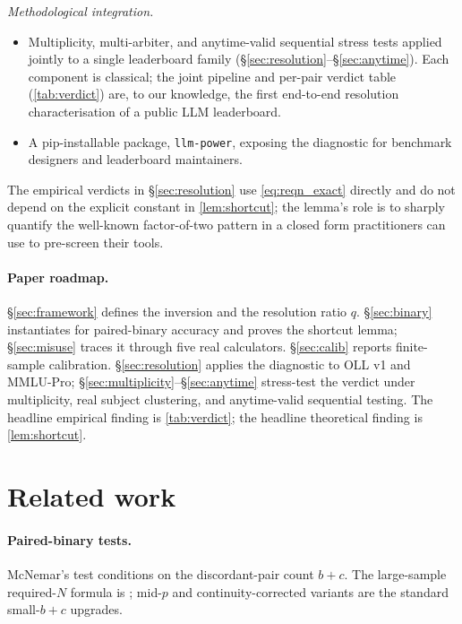 \documentclass{article}
\theoremstyle{plain}
\theoremstyle{definition}
\begin{document}
\noindent\emph{Methodological integration.}
\begin{itemize}[leftmargin=*, itemsep=0pt, topsep=2pt]
\item Multiplicity, multi-arbiter, and anytime-valid sequential stress tests applied jointly to a single leaderboard family (\S\ref{sec:resolution}--\S\ref{sec:anytime}). Each component is classical; the joint pipeline and per-pair verdict table (\cref{tab:verdict}) are, to our knowledge, the first end-to-end resolution characterisation of a public LLM leaderboard.
\item A pip-installable package, \texttt{llm-power}, exposing the diagnostic for benchmark designers and leaderboard maintainers.
\end{itemize}

\noindent The empirical verdicts in \S\ref{sec:resolution} use \cref{eq:reqn_exact} directly and do not depend on the explicit constant in \cref{lem:shortcut}; the lemma's role is to sharply quantify the well-known factor-of-two pattern in a closed form practitioners can use to pre-screen their tools.

\paragraph{Paper roadmap.} \S\ref{sec:framework} defines the inversion and the resolution ratio $q$. \S\ref{sec:binary} instantiates for paired-binary accuracy and proves the shortcut lemma; \S\ref{sec:misuse} traces it through five real calculators. \S\ref{sec:calib} reports finite-sample calibration. \S\ref{sec:resolution} applies the diagnostic to OLL v1 and MMLU-Pro; \S\ref{sec:multiplicity}--\S\ref{sec:anytime} stress-test the verdict under multiplicity, real subject clustering, and anytime-valid sequential testing. The headline empirical finding is \cref{tab:verdict}; the headline theoretical finding is \cref{lem:shortcut}.

\section{Related work}
\label{sec:related}

\paragraph{Paired-binary tests.} McNemar's test \citep{mcnemar1947note} conditions on the discordant-pair count $b{+}c$. The large-sample required-$N$ formula is \citet{connor1987sample}; mid-$p$ \citep{liddell1983simplified} and continuity-corrected variants \citep{agresti2005simple} are the standard small-$b{+}c$ upgrades.
\end{document}
